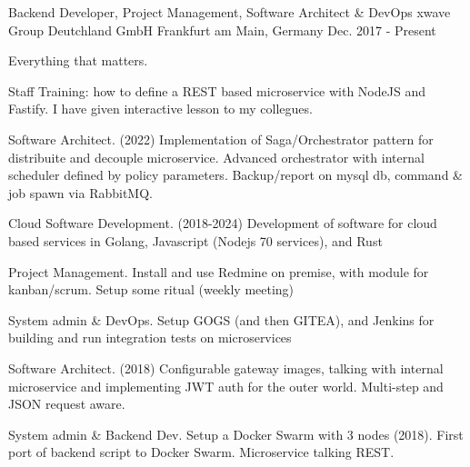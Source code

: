 

\begin{cventries}

  \cventry
    {Backend Developer, Project Management, Software Architect \& DevOps} %
    {xwave Group Deutchland GmbH} %
    {Frankfurt am Main, Germany} %
    {Dec. 2017 - Present} %
    {
      \begin{cvitems} %
        \item {Everything that matters.}
        \item {Staff Training: how to define a REST based microservice with NodeJS and Fastify. I have given interactive lesson to my collegues.}
        \item {Software Architect. (2022) Implementation of Saga/Orchestrator pattern for distribuite and decouple microservice. Advanced orchestrator with internal scheduler defined by policy parameters. Backup/report on mysql db, command \& job spawn via RabbitMQ.}
        \item {Cloud Software Development. (2018-2024) Development of software for cloud based services in Golang, Javascript (Nodejs 70 services), and Rust}
        \item {Project Management. Install and use Redmine on premise, with module for kanban/scrum. Setup some ritual (weekly meeting)}
        \item {System admin \& DevOps. Setup GOGS (and then GITEA), and Jenkins for building and run integration tests on microservices}
        \item {Software Architect. (2018) Configurable gateway images, talking with internal microservice and implementing JWT auth for the outer world. Multi-step and JSON request aware.}
        \item {System admin \& Backend Dev. Setup a Docker Swarm with 3 nodes (2018). First port of backend script to Docker Swarm. Microservice talking REST.}
      \end{cvitems}
    }


\end{cventries}
